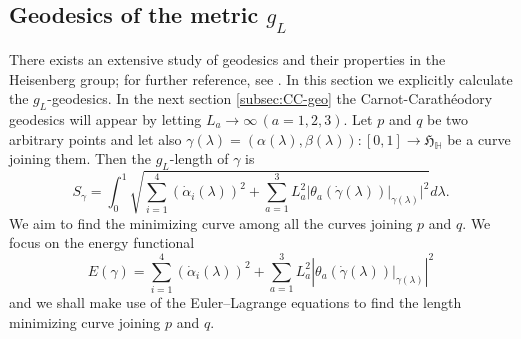\documentclass [12pt,a4paper]{amsart}
\newcommand{\mH}{\mathbb{H}}
\newcommand{\frakH}{\mathfrak{H}}
\theoremstyle{plain}
\theoremstyle{definition}
\numberwithin{equation}{section}
\begin{document}
\subsection{Geodesics of the metric $g_L$}
There exists an extensive study of geodesics and their properties in the Heisenberg group; for further reference, see \cite{BM, LM, Mont, Mon}. 
In this section we explicitly calculate the $g_L$-geodesics. In the next section \ref{subsec:CC-geo} the Carnot-Carathéodory geodesics will appear by letting $L_a\to \infty\, (a=1, 2, 3).$
Let $p$ and $q$ be two arbitrary points and let also $\gamma(\lambda)=(\alpha(\lambda), \beta(\lambda)): [0, 1]\to\frakH_\mH$ be a curve joining them. Then the $g_L$-length of $\gamma$ is
\[
S_{\gamma}=\int_{0}^1\sqrt{\sum_{i=1}^4 (\dot \alpha_i(\lambda))^2+\sum_{a=1}^3L_a^2
|\theta_a(\dot\gamma(\lambda))|_{\gamma(\lambda)}|^2} d\lambda.
\]
We aim to find the minimizing curve among all the curves joining $p$ and $q.$ We focus on the energy functional 
$$E(\gamma)=\sum_{i=1}^4 (\dot\alpha_i(\lambda))^2+\sum_{a=1}^3L_a^2\left|\theta_a(\dot\gamma(\lambda))|_{\gamma(\lambda)}\right|^2$$
and we shall make use of the Euler--Lagrange equations to find the length minimizing curve joining $p$ and $q$.
\end{document}
